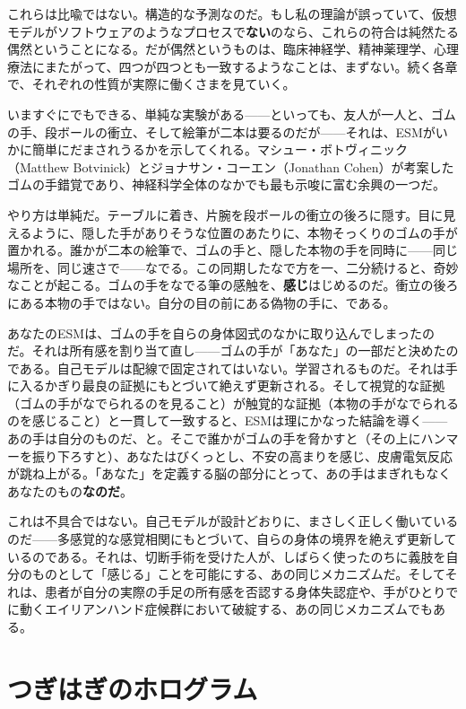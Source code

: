 \documentclass[11pt, twoside, openright]{book}
\begin{document}
これらは比喩ではない。構造的な予測なのだ。もし私の理論が誤っていて、仮想モデルがソフトウェアのようなプロセスで\textbf{ない}のなら、これらの符合は純然たる偶然ということになる。だが偶然というものは、臨床神経学、精神薬理学、心理療法にまたがって、四つが四つとも一致するようなことは、まずない。続く各章で、それぞれの性質が実際に働くさまを見ていく。

いますぐにでもできる、単純な実験がある------といっても、友人が一人と、ゴムの手、段ボールの衝立、そして絵筆が二本は要るのだが------それは、ESMがいかに簡単にだまされうるかを示してくれる。マシュー・ボトヴィニック（Matthew Botvinick）とジョナサン・コーエン（Jonathan Cohen）が考案したゴムの手錯覚であり、神経科学全体のなかでも最も示唆に富む余興の一つだ。

やり方は単純だ。テーブルに着き、片腕を段ボールの衝立の後ろに隠す。目に見えるように、隠した手がありそうな位置のあたりに、本物そっくりのゴムの手が置かれる。誰かが二本の絵筆で、ゴムの手と、隠した本物の手を同時に------同じ場所を、同じ速さで------なでる。この同期したなで方を一、二分続けると、奇妙なことが起こる。ゴムの手をなでる筆の感触を、\textbf{感じ}はじめるのだ。衝立の後ろにある本物の手ではない。自分の目の前にある偽物の手に、である。

あなたのESMは、ゴムの手を自らの身体図式のなかに取り込んでしまったのだ。それは所有感を割り当て直し------ゴムの手が「あなた」の一部だと決めたのである。自己モデルは配線で固定されてはいない。学習されるものだ。それは手に入るかぎり最良の証拠にもとづいて絶えず更新される。そして視覚的な証拠（ゴムの手がなでられるのを見ること）が触覚的な証拠（本物の手がなでられるのを感じること）と一貫して一致すると、ESMは理にかなった結論を導く------あの手は自分のものだ、と。そこで誰かがゴムの手を脅かすと（その上にハンマーを振り下ろすと）、あなたはびくっとし、不安の高まりを感じ、皮膚電気反応が跳ね上がる。「あなた」を定義する脳の部分にとって、あの手はまぎれもなくあなたのもの\textbf{なのだ}。

これは不具合ではない。自己モデルが設計どおりに、まさしく正しく働いているのだ------多感覚的な感覚相関にもとづいて、自らの身体の境界を絶えず更新しているのである。それは、切断手術を受けた人が、しばらく使ったのちに義肢を自分のものとして「感じる」ことを可能にする、あの同じメカニズムだ。そしてそれは、患者が自分の実際の手足の所有感を否認する身体失認症や、手がひとりでに動くエイリアンハンド症候群において破綻する、あの同じメカニズムでもある。

\section*{つぎはぎのホログラム}
\end{document}
